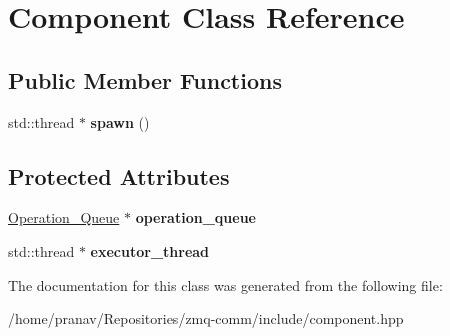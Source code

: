 \hypertarget{classComponent}{}\section{Component Class Reference}
\label{classComponent}
\subsection*{Public Member Functions}
\begin{DoxyCompactItemize}
\item 
std\+::thread $\ast$ {\bfseries spawn} ()\hypertarget{classComponent_a18c2c6005703233baba1881a301c3c2e}{}\label{classComponent_a18c2c6005703233baba1881a301c3c2e}

\end{DoxyCompactItemize}
\subsection*{Protected Attributes}
\begin{DoxyCompactItemize}
\item 
\hyperlink{classOperation__Queue}{Operation\+\_\+\+Queue} $\ast$ {\bfseries operation\+\_\+queue}\hypertarget{classComponent_a403c5d873156e4933d4bf617e8031b87}{}\label{classComponent_a403c5d873156e4933d4bf617e8031b87}

\item 
std\+::thread $\ast$ {\bfseries executor\+\_\+thread}\hypertarget{classComponent_aba9f6d41585cffa7939b982827659862}{}\label{classComponent_aba9f6d41585cffa7939b982827659862}

\end{DoxyCompactItemize}


The documentation for this class was generated from the following file\+:\begin{DoxyCompactItemize}
\item 
/home/pranav/\+Repositories/zmq-\/comm/include/component.\+hpp\end{DoxyCompactItemize}
